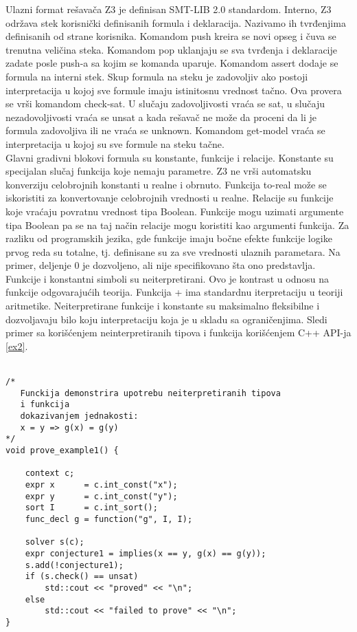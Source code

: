 \documentclass[12pt,oneside]{memoir}
\begin{document}
Ulazni format rešavača Z3 je definisan SMT-LIB 2.0 standardom. Interno, Z3 održava stek korisnički definisanih formula i deklaracija. Nazivamo ih tvrđenjima definisanih od strane korisnika. Komandom push kreira se novi opseg i čuva se trenutna veličina steka. Komandom pop uklanjaju se sva tvrđenja i deklaracije zadate posle push-a sa kojim se komanda uparuje. Komandom assert dodaje se formula na interni stek. Skup formula na steku je zadovoljiv ako postoji interpretacija u kojoj sve formule imaju istinitosnu vrednost tačno. Ova provera se vrši komandom check-sat. U slučaju zadovoljivosti vraća se sat, u slučaju nezadovoljivosti vraća se unsat a kada rešavač ne može da proceni da li je formula zadovoljiva ili ne vraća se unknown. Komandom get-model vraća se interpretacija u kojoj su sve formule na steku tačne. 
\\

Glavni gradivni blokovi formula su konstante, funkcije i relacije. Konstante su specijalan slučaj funkcija koje nemaju parametre. Z3 ne vrši automatsku konverziju celobrojnih konstanti u realne i obrnuto. Funkcija to-real može se iskoristiti za konvertovanje celobrojnih vrednosti u realne. Relacije su funkcije koje vraćaju povratnu vrednost tipa Boolean. Funkcije mogu uzimati argumente tipa Boolean pa se na taj način relacije mogu koristiti kao argumenti funkcija. Za razliku od programskih jezika, gde funkcije imaju bočne efekte funkcije logike prvog reda su totalne, tj. definisane su za sve vrednosti ulaznih parametara. Na primer, deljenje 0 je dozvoljeno, ali nije specifikovano šta ono predstavlja. Funkcije i konstantni simboli su neiterpretirani. Ovo je kontrast u odnosu na funkcije odgovarajućih teorija. Funkcija + ima standardnu iterpretaciju u teoriji aritmetike. Neiterpretirane funkcije i konstante su maksimalno fleksibilne i dozvoljavaju bilo koju interpretaciju koja je u skladu sa ograničenjima. 
Sledi primer sa korišćenjem neinterpretiranih tipova i funkcija korišćenjem C++ API-ja \ref{ex2}. 
\\ \\
\begin{lstlisting}
/*
   Funckija demonstrira upotrebu neiterpretiranih tipova
   i funkcija 
   dokazivanjem jednakosti:
   x = y => g(x) = g(y)
*/
void prove_example1() {
    
    context c;
    expr x      = c.int_const("x");
    expr y      = c.int_const("y");
    sort I      = c.int_sort();
    func_decl g = function("g", I, I);
    
    solver s(c);
    expr conjecture1 = implies(x == y, g(x) == g(y));
    s.add(!conjecture1);
    if (s.check() == unsat) 
        std::cout << "proved" << "\n";
    else
        std::cout << "failed to prove" << "\n";
}


\end{lstlisting}
\end{document}
